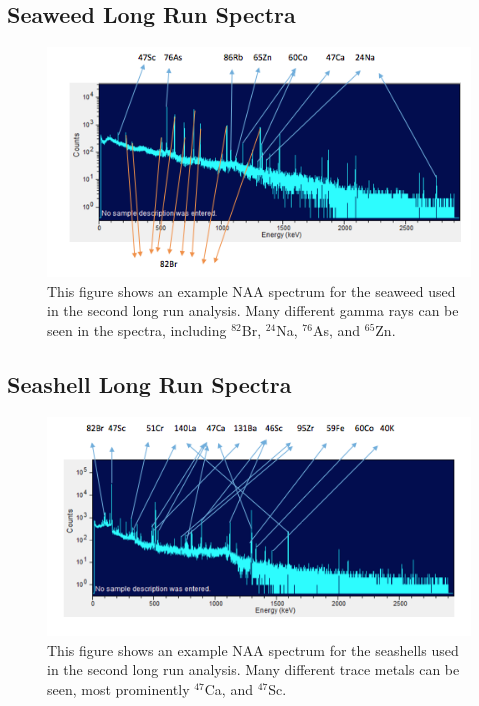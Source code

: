 \documentclass[]{article}
\begin{document}
\subsection{Seaweed Long Run Spectra}


\begin{figure}[htb!]
\centering
\includegraphics[scale=0.8]{SeaweedSpectra}
\caption{This figure shows an example NAA spectrum for the seaweed used in the second long run analysis. Many different gamma rays can be seen in the spectra, including $^{82}$Br, $^{24}$Na, $^{76}$As, and $^{65}$Zn.}
\end{figure} 

\pagebreak

\subsection{Seashell Long Run Spectra}

\begin{figure}[htb!]
\centering
\includegraphics[scale=0.8]{SeashellSpectra}
\caption{This figure shows an example NAA spectrum for the seashells used in the second long run analysis. Many different trace metals can be seen, most prominently $^{47}$Ca, and $^{47}$Sc.}
\end{figure} 
\end{document}
